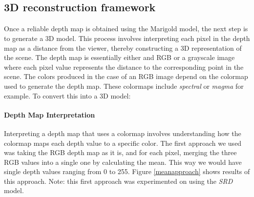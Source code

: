 \documentclass[12pt, letterpaper]{article}
\begin{document}
\begin{spacing}{1.15}
\subsection{3D reconstruction framework}
\paragraph{}
Once a reliable depth map is obtained using the Marigold model, the next step is to generate a 3D model. This process involves interpreting each pixel in the depth map as
a distance from the viewer, thereby constructing a 3D representation of the scene.
The depth map is essentially either and RGB or a grayscale image where each pixel value represents the distance to the corresponding point in the scene. The colors produced in the case of 
an RGB image depend on the colormap used to generate the depth map. These colormaps include \textit{spectral} or \textit{magma} for example. To convert this into a 3D model:

\paragraph{Depth Map Interpretation} Interpreting a depth map that uses a colormap involves understanding how the colormap maps each depth value to a specific color.
The first approach we used was taking the RGB depth map as it is, and for each pixel, merging the three RGB values into a single one by calculating the mean. This way we would have single depth
values ranging from 0 to 255. Figure \ref{meanapproach} shows results of this approach. Note: this first approach was experimented on using the \emph{SRD} model.


\end{spacing}
\end{document}
